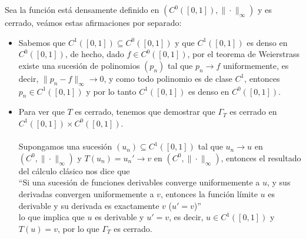 \begin{ejemplo}
    Sea la función
    está densamente definido en $(C^0([0, 1]), \|\cdot\|_\infty)$ y es cerrado, veámos estas afirmaciones por separado:
    \begin{itemize}
        \item Sabemos que $C^1([0, 1]) \subseteq C^0([0, 1])$ y que $C^1([0, 1])$ es denso en $C^0([0, 1])$, de hecho, dado $f \in C^0([0, 1])$, por el teorema de Weierstrass existe una sucesión de polinomios $(p_n)$ tal que $p_n \to f$ uniformemente, es decir, $\|p_n - f\|_\infty \to 0$, y como todo polinomio es de clase $C^1$, entonces $p_n \in C^1([0, 1])$ y por lo tanto $C^1([0, 1])$ es denso en $C^0([0, 1])$.
        \item Para ver que $T$ es cerrado, tenemos que demostrar que $\Gamma_T$ es cerrado en $C^1([0, 1]) \times C^0([0, 1])$. \\ \\
        \noindent
        Supongamos una sucesión $(u_n) \subseteq C^1([0, 1])$ tal que $u_n \to u$ en $(C^0, \|\cdot\|_\infty)$ y $T(u_n) = u_n' \to v$ en $(C^0, \|\cdot\|_\infty)$, entonces el resultado del cálculo clásico nos dice que \\

        \noindent
        ``Si una sucesión de funciones derivables converge uniformemente a $u$, y sus derivadas convergen uniformemente a $v$, entonces la función límite $u$ es derivable y su derivada es exactamente $v$ ($u' = v$)'' \\
        
        \noindent
        lo que implica que $u$ es derivable y $u' = v$, es decir, $u \in C^1([0, 1])$ y $T(u) = v$, por lo que $\Gamma_T$ es cerrado.
        
        

    \end{itemize}
\end{ejemplo}

